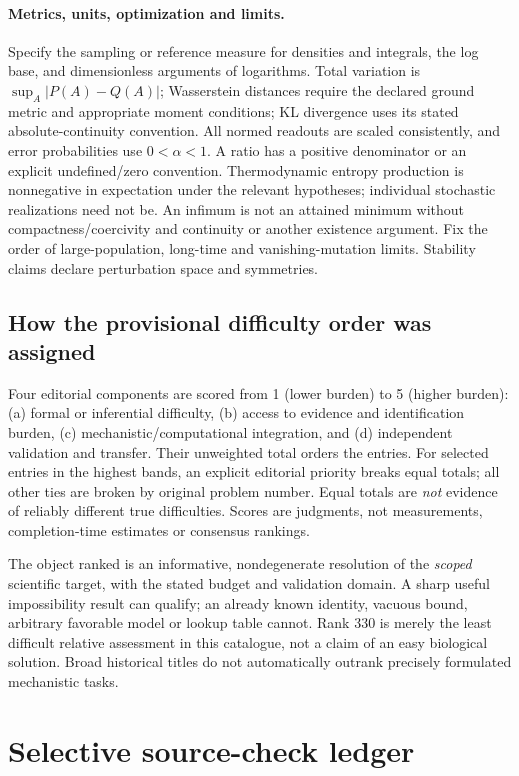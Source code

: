 \documentclass[11pt]{article}
\begin{document}
\paragraph{Metrics, units, optimization and limits.}
Specify the sampling or reference measure for densities and integrals, the log base, and dimensionless arguments of logarithms. Total variation is $\sup_A|P(A)-Q(A)|$; Wasserstein distances require the declared ground metric and appropriate moment conditions; KL divergence uses its stated absolute-continuity convention. All normed readouts are scaled consistently, and error probabilities use $0<\alpha<1$. A ratio has a positive denominator or an explicit undefined/zero convention. Thermodynamic entropy production is nonnegative in expectation under the relevant hypotheses; individual stochastic realizations need not be. An infimum is not an attained minimum without compactness/coercivity and continuity or another existence argument. Fix the order of large-population, long-time and vanishing-mutation limits. Stability claims declare perturbation space and symmetries.

\subsection*{How the provisional difficulty order was assigned}
Four editorial components are scored from 1 (lower burden) to 5 (higher burden): (a) formal or inferential difficulty, (b) access to evidence and identification burden, (c) mechanistic/computational integration, and (d) independent validation and transfer. Their unweighted total orders the entries. For selected entries in the highest bands, an explicit editorial priority breaks equal totals; all other ties are broken by original problem number. Equal totals are \emph{not} evidence of reliably different true difficulties. Scores are judgments, not measurements, completion-time estimates or consensus rankings.

The object ranked is an informative, nondegenerate resolution of the \emph{scoped} scientific target, with the stated budget and validation domain. A sharp useful impossibility result can qualify; an already known identity, vacuous bound, arbitrary favorable model or lookup table cannot. Rank 330 is merely the least difficult relative assessment in this catalogue, not a claim of an easy biological solution. Broad historical titles do not automatically outrank precisely formulated mechanistic tasks.


\section*{Selective source-check ledger}
\end{document}
